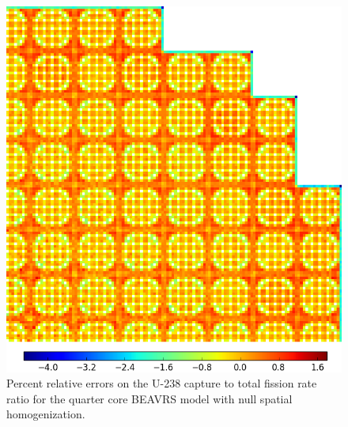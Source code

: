 \begin{figure}[hb!]
\centering
\includegraphics[width=0.65\linewidth]{figures/results/capt-to-fiss/spatial/full-core/capt-to-fiss-err-null}
\caption[Capture-to-fission rate error spatial distributions]{Percent relative errors on the U-238 capture to total fission rate ratio for the quarter core \ac{BEAVRS} model with null spatial homogenization.}
\label{fig:chap11-full-core-capt-to-fiss-err-null}
\end{figure}

